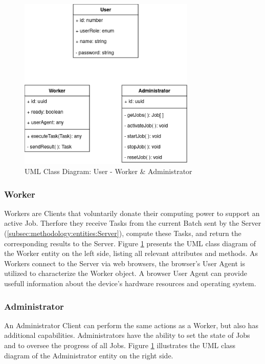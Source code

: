 \begin{figure}[htbp]
  \centering
  \includegraphics[width=0.75\textwidth]{gfx/figures/Client.png}
  \caption{\ac{UML} Class Diagram: User - Worker \& Administrator}
  \label{fig:methodology:client}
\end{figure}

\subsubsection{Worker}
\label{ssubsec:methodology:entities:client:worker}
Workers are Clients that voluntarily donate their computing power to support an active Job. Therfore they receive Tasks from the current Batch sent by the Server (\ref{subsec:methodology:entities:Server}), compute these Tasks, and return the corresponding results to the Server. Figure \ref{fig:methodology:client} presents the \ac{UML} class diagram of the Worker entity on the left side, listing all relevant attributes and methods. As Workers connect to the Server via web browsers, the browser's User Agent is utilized to characterize the Worker object. A browser User Agent can provide usefull information about the device's hardware resources and operating system.

\subsubsection{Administrator}
\label{ssubsec:methodology:entities:client:admin}
An Administrator Client can perform the same actions as a Worker, but also has additional capabilities. Administrators have the ability to set the state of Jobs and to oversee the progress of all Jobs. Figure \ref{fig:methodology:client} illustrates the \ac{UML} class diagram of the Administrator entity on the right side.

